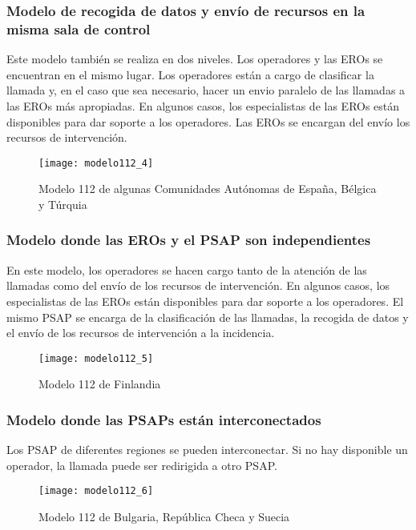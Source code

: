 \subsubsection{Modelo de recogida de datos y envío de recursos en la misma sala de control}

Este modelo también se realiza en dos niveles. Los operadores y las EROs se encuentran en el mismo lugar. Los operadores están a cargo de clasificar la llamada y, en el caso que sea necesario, hacer un envio paralelo de las llamadas a las EROs más apropiadas. En algunos casos, los especialistas de las EROs están disponibles para dar soporte a los operadores. Las EROs se encargan del envío los recursos de intervención.

\begin{figure}[htp!]
  \centering
  \texttt{[image: modelo112\_4]}
  \caption{Modelo 112 de algunas Comunidades Autónomas de España, Bélgica y Túrquia}
  \label{fig:modelo112_4}
\end{figure}

\subsubsection{Modelo donde las EROs y el PSAP son independientes}

En este modelo, los operadores se hacen cargo tanto de la atención de las llamadas como del envío de los recursos de intervención. En algunos casos, los especialistas de las EROs están disponibles para dar soporte a los operadores. El mismo PSAP se encarga de la clasificación de las llamadas, la recogida de datos y el envío de los recursos de intervención a la incidencia.

\begin{figure}[htp!]
  \centering
  \texttt{[image: modelo112\_5]}
  \caption{Modelo 112 de Finlandia}
  \label{fig:modelo112_5}
\end{figure}

\subsubsection{Modelo donde las PSAPs están interconectados}

Los PSAP de diferentes regiones se pueden interconectar. Si no hay disponible un operador, la llamada puede ser redirigida a otro PSAP.

\begin{figure}[htp!]
  \centering
  \texttt{[image: modelo112\_6]}
  \caption{Modelo 112 de Bulgaria, República Checa y Suecia}
  \label{fig:modelo112_6}
\end{figure}

